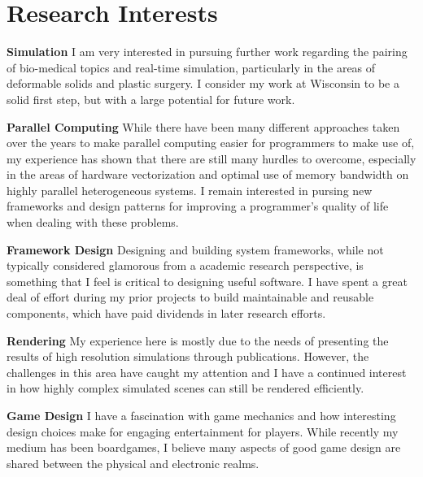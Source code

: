 \documentclass{cv-style}     %
\begin{document}
\section{Research Interests}
  \vspace{-0.2cm}

  \textbf{Simulation} I am very interested in
  pursuing further work regarding the pairing of
  bio-medical topics and real-time simulation,
  particularly in the areas of deformable solids
  and plastic surgery. I consider my work at
  Wisconsin to be a solid first step, but with a
  large potential for future work.

  \textbf{Parallel Computing} While there have
  been many different approaches taken over the
  years to make parallel computing easier for
  programmers to make use of, my experience has
  shown that there are still many hurdles to
  overcome, especially in the areas of hardware
  vectorization and optimal use of memory
  bandwidth on highly parallel heterogeneous
  systems. I remain interested in pursing new
  frameworks and design patterns for improving
  a programmer's quality of life when dealing with
  these problems.

  \textbf{Framework Design} Designing and building
  system frameworks, while not typically
  considered glamorous from a academic research
  perspective, is something that I feel is
  critical to designing useful software. I have
  spent a great deal of effort during my prior
  projects to build maintainable and reusable
  components, which have paid dividends in later
  research efforts.

  \textbf{Rendering} My experience here is mostly
  due to the needs of presenting the results of
  high resolution simulations through
  publications. However, the challenges in this area
  have caught my attention and I have a continued
  interest in how highly complex simulated scenes
  can still be rendered efficiently.

  \textbf{Game Design} I have a fascination with
  game mechanics and how interesting design
  choices make for engaging entertainment for
  players. While recently my medium has been
  boardgames, I believe many aspects of good game
  design are shared between the physical and
  electronic realms.

\end{document}
